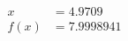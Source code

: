 \documentclass[preview]{standalone}
\begin{document}
\begin{align*}
x &= 4.9709\\f(x) &= 7.9998941
\end{align*}
\end{document}
